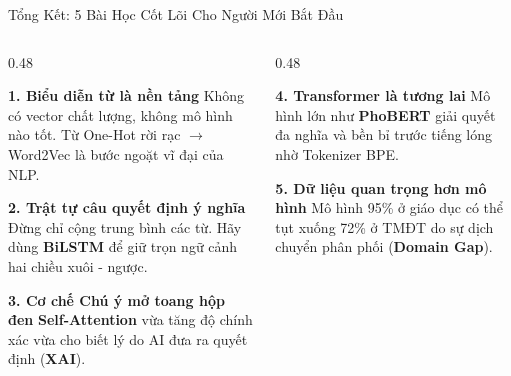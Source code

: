 \documentclass[aspectratio=169, 10pt]{beamer}
\begin{document}
\begin{frame}{Tổng Kết: 5 Bài Học Cốt Lõi Cho Người Mới Bắt Đầu}
  \begin{columns}[T, onlytextwidth]
    \begin{column}{0.48\textwidth}
      \begin{block}{\small\textbf{1. Biểu diễn từ là nền tảng}}
        \fontsize{7.5}{9.5}\selectfont
        Không có vector chất lượng, không mô hình nào tốt. Từ One-Hot rời rạc $\to$ Word2Vec là bước ngoặt vĩ đại của NLP.
      \end{block}
      \vspace{0.15cm}
      \begin{block}{\small\textbf{2. Trật tự câu quyết định ý nghĩa}}
        \fontsize{7.5}{9.5}\selectfont
        Đừng chỉ cộng trung bình các từ. Hãy dùng \textbf{BiLSTM} để giữ trọn ngữ cảnh hai chiều xuôi - ngược.
      \end{block}
      \vspace{0.15cm}
      \begin{block}{\small\textbf{3. Cơ chế Chú ý mở toang hộp đen}}
        \fontsize{7.5}{9.5}\selectfont
        \textbf{Self-Attention} vừa tăng độ chính xác vừa cho biết lý do AI đưa ra quyết định (\textbf{XAI}).
      \end{block}
    \end{column}
    \hfill
    \begin{column}{0.48\textwidth}
      \begin{block}{\small\textbf{4. Transformer là tương lai}}
        \fontsize{7.5}{9.5}\selectfont
        Mô hình lớn như \textbf{PhoBERT} giải quyết đa nghĩa và bền bỉ trước tiếng lóng nhờ Tokenizer BPE.
      \end{block}
      \vspace{0.15cm}
      \begin{exampleblock}{\small\textbf{5. Dữ liệu quan trọng hơn mô hình}}
        \fontsize{7.5}{9.5}\selectfont
        Mô hình 95\% ở giáo dục có thể tụt xuống 72\% ở TMĐT do sự dịch chuyển phân phối (\textbf{Domain Gap}).
      \end{exampleblock}
    \end{column}
  \end{columns}
\end{frame}
\end{document}
